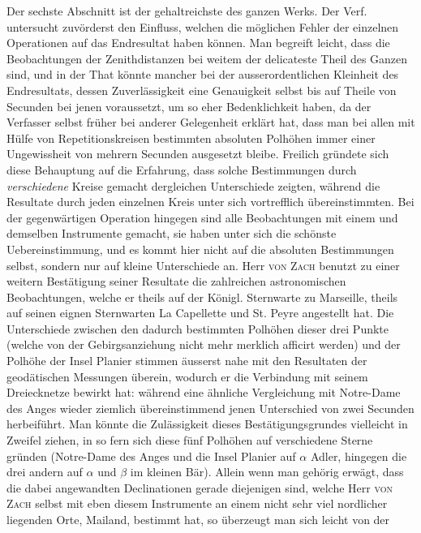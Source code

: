 Der sechste Abschnitt ist der gehaltreichste des ganzen Werks. Der Verf. untersucht
zuvörderst den Einfluss, welchen die möglichen Fehler der einzelnen Operationen auf das
Endresultat haben können. Man begreift leicht, dass die Beobachtungen der Zenithdistanzen bei
weitem der delicateste Theil des Ganzen sind, und in der That könnte mancher bei der
ausserordentlichen Kleinheit des Endresultats, dessen Zuverlässigkeit eine Genauigkeit selbst bis
auf Theile von Secunden bei jenen voraussetzt, um so eher Bedenklichkeit haben, da der Verfasser
selbst früher bei anderer Gelegenheit erklärt hat, dass man bei allen mit Hülfe von
Repetitionskreisen bestimmten absoluten Polhöhen immer einer Ungewissheit von mehrern Secunden
ausgesetzt bleibe. Freilich gründete sich diese Behauptung auf die Erfahrung, dass solche
Bestimmungen durch \emph{verschiedene} Kreise gemacht dergleichen Unterschiede zeigten, während die
Resultate durch jeden einzelnen Kreis unter sich vortrefflich übereinstimmten. Bei der
gegenwärtigen Operation hingegen sind alle Beobachtungen mit einem und demselben Instrumente
gemacht, sie haben unter sich die schönste Uebereinstimmung, und es kommt hier nicht auf die
absoluten Bestimmungen selbst, sondern nur auf kleine Unterschiede an. Herr \textsc{von Zach}
benutzt zu einer weitern Bestätigung seiner Resultate die zahlreichen astronomischen
Beobachtungen, welche er theils auf der Königl. Sternwarte zu Marseille, theils auf seinen eignen
Sternwarten La Capellette und St. Peyre angestellt hat. Die Unterschiede zwischen den dadurch
bestimmten Polhöhen dieser drei Punkte (welche von der Gebirgsanziehung nicht mehr merklich
afficirt werden) 
und der Polhöhe der Insel Planier stimmen äusserst nahe mit den Resultaten der geodätischen
Messungen überein, wodurch er die Verbindung mit seinem Dreiecknetze bewirkt hat: während eine
ähnliche Vergleichung mit Notre-Dame des Anges wieder ziemlich übereinstimmend jenen Unterschied
von zwei Secunden herbeiführt. Man könnte die Zulässigkeit dieses Bestätigungsgrundes vielleicht in
Zweifel ziehen, in so fern sich diese fünf Polhöhen auf verschiedene Sterne gründen (Notre-Dame des
Anges und die Insel Planier auf $\alpha$ Adler, hingegen die drei andern auf $\alpha$ und $\beta$
im kleinen Bär). Allein wenn man gehörig erwägt, dass die dabei angewandten Declinationen gerade
diejenigen sind, welche Herr \textsc{von Zach} selbst mit eben diesem Instrumente an einem nicht
sehr viel nordlicher liegenden Orte, Mailand, bestimmt hat, so überzeugt man sich leicht von der
